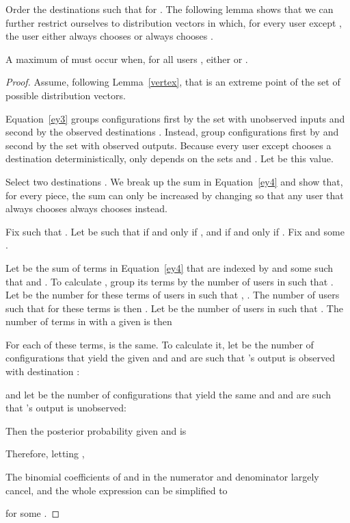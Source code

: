 \documentclass[prodmode,acmtissec]{acmsmall}
\begin{document}
Order the destinations  such that  for .  The following lemma shows that we can further restrict ourselves to distribution vectors in which, for every user except , the user either always chooses  or always chooses .

\begin{lemma} \label{ef}
A maximum of  must occur when, for all users , either  or .
\end{lemma}
\begin{proof}
Assume, following Lemma~\ref{vertex}, that  is an extreme point of the set of possible distribution vectors.

Equation~\ref{ey3} groups configurations first by the set  with unobserved inputs and second by the observed destinations .  Instead, group configurations first by  and second by the set  with observed outputs.  Because every user except  chooses a destination deterministically,  only depends on the sets  and .  Let  be this value.


Select two destinations .  We break up the sum in Equation~\ref{ey4} and show that, for every piece, the sum can only be increased by changing  so that any user that always chooses  always chooses  instead.

Fix  such that .  Let  be such that  if and only if , and  if and only if .  Fix  and some .

Let  be the sum of terms in Equation~\ref{ey4} that are indexed by  and some  such that  and .  To calculate , group its terms by the number  of users  in  such that .  Let  be the number for these terms of users  in  such that , .  The number  of users  such that  for these terms is then .  Let  be the number of users  in  such that . The number of terms in  with a given  is then

For each of these terms,  is the same.  To calculate it, let  be the number of configurations that yield the given  and  and are such that 's output is observed with destination :

and let  be the number of configurations that yield the same  and  and are such that 's output is unobserved:

Then the posterior probability given  and  is

Therefore, letting ,


The binomial coefficients of  and  in the numerator and denominator largely cancel, and the whole expression can be simplified to

for some .




\end{proof}
\end{document}
